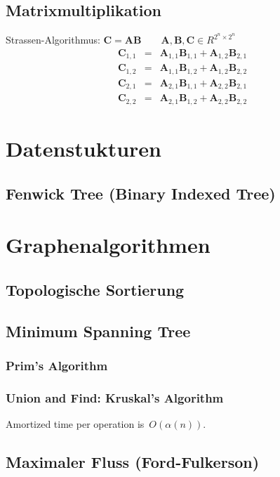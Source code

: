 \documentclass[10pt,a4paper,ngerman]{article}
\begin{document}
\subsection{Matrixmultiplikation}
Strassen-Algorithmus: $\mathbf{C} = \mathbf{A} \mathbf{B} \qquad \mathbf{A},\mathbf{B},\mathbf{C} \in R^{2^n \times 2^n}$
\begin{eqnarray*}
\mathbf{C}_{1,1} & =& \mathbf{A}_{1,1} \mathbf{B}_{1,1} + \mathbf{A}_{1,2} \mathbf{B}_{2,1} \\
\mathbf{C}_{1,2} &=& \mathbf{A}_{1,1} \mathbf{B}_{1,2} + \mathbf{A}_{1,2} \mathbf{B}_{2,2}\\
\mathbf{C}_{2,1} &=& \mathbf{A}_{2,1} \mathbf{B}_{1,1} + \mathbf{A}_{2,2} \mathbf{B}_{2,1} \\
\mathbf{C}_{2,2} &=& \mathbf{A}_{2,1} \mathbf{B}_{1,2} + \mathbf{A}_{2,2} \mathbf{B}_{2,2}
\end{eqnarray*}
\section{Datenstukturen}
\subsection{Fenwick Tree (Binary Indexed Tree)}


\section{Graphenalgorithmen}
\subsection{Topologische Sortierung}

\subsection{Minimum Spanning Tree}
\subsubsection{Prim's Algorithm}

\subsubsection{Union and Find: Kruskal's Algorithm}
Amortized time per operation is~$O(\alpha(n))$.

\subsection{Maximaler Fluss (Ford-Fulkerson)}


%

\end{document}
